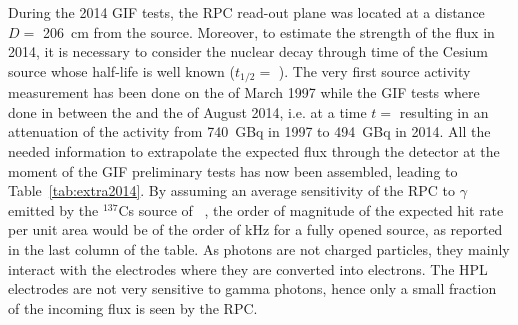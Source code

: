 	During the 2014 GIF tests, the RPC read-out plane was located at a distance $D=$ \SI{206}{cm} from the source. Moreover, to estimate the strength of the flux in 2014, it is necessary to consider the nuclear decay through time of the Cesium source whose half-life is well known ($t_{1/2}=$ ). The very first source activity measurement has been done on the  of March 1997 while the GIF tests where done in between the  and the  of August 2014, i.e. at a time $t=$  resulting in an attenuation of the activity from \SI{740}{GBq} in 1997 to \SI{494}{GBq} in 2014. All the needed information to extrapolate the expected flux through the detector at the moment of the GIF preliminary tests has now been assembled, leading to Table~\ref{tab:extra2014}. By assuming an average sensitivity of the RPC to $\gamma$ emitted by the $^{137}$Cs source of ~\cite{PUGLIESE2003}, the order of magnitude of the expected hit rate per unit area would be of the order of \si{kHz} for a fully opened source, as reported in the last column of the table. As photons are not charged particles, they mainly interact with the electrodes where they are converted into electrons. The HPL electrodes are not very sensitive to gamma photons, hence only a small fraction of the incoming flux is seen by the RPC.
	

